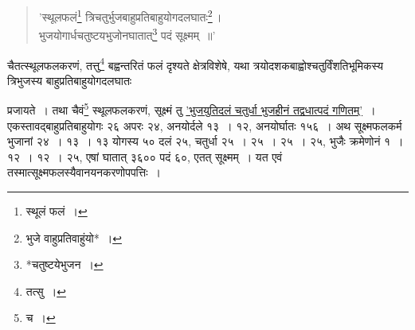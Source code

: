 \documentclass[10pt, openany]{book}
\begin{document}
{{{{{{{{{{{{{{{{{\begin{quote}

{\qt  'स्थूलफलं\renewcommand{\thefootnote}{६}\footnote{स्थूलं फलं~।} त्रिचतुर्भुजबाहुप्रतिबाहुयोगदलघातः\renewcommand{\thefootnote}{७}\footnote{भुजे वाहुप्रतिवाहुंयो*~।}\,।\\
 भुजयोगार्धचतुष्टयभुजोनघातात्\renewcommand{\thefootnote}{८}\footnote{*चतुष्टयेभुजन~।} पदं सूक्ष्मम्~॥'}\end{quote}

{चैतत्स्थूलफलकरणं, तत्तु\renewcommand{\thefootnote}{१२}\footnote{तत्सु~।} बह्वन्तरितं फलं दृश्यते क्षेत्रविशेषे,
यथा त्रयोदशकबाह्वोश्चतुर्विंशतिभूमिकस्य त्रिभुजस्य बाहुप्रतिबाहुयोगदलघातः}

\newpage

{प्रजायते~। तथा चैवं\renewcommand{\thefootnote}{२}\footnote{च~।} स्थूलफलकरणं, सूक्ष्मं तु \hyperref[117]{'भुजयुतिदलं चतुर्धा भुजहीनं तद्वधात्पदं गणितम्'}~।}
{एकस्तावद्बाहुप्रतिबाहुयोगः २६ अपरः २४, अनयोर्दले १३~। १२, अनयोर्घातः
१५६~।}
{अथ सूक्ष्मफलकर्म\textendash \,भुजानां २४~। १३~। १३ योगस्य ५० दलं २५, चतुर्धा २५~। 
२५~।}
{२५~। २५, भुजैः क्रमेणोनं १~। १२~। १२~। २५, एषां घातात् ३६०० पदं ६०, एतत्
सूक्ष्मम्~।}
{यत एवं तस्मात्सूक्ष्मफलस्यैवानयनकरणोपपत्तिः~।}
\vspace{3mm}

}}}}}}}}}}}}}}}}}
\end{document}
